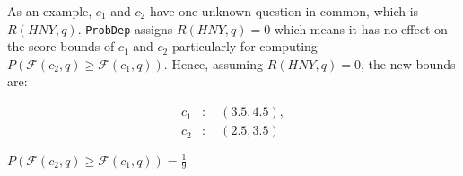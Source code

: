 \begin{comment}
\begin{center}
$Dict(c_1) = \{c_2 = 3.5, c_2 = 4\}$.    
\end{center}




Since each $c_1$ and $c_2$ have 5 possible values, there are $25$ different combinations between them, and since there are 6 edges or equivalently, there are totally 6 values for all keys/nodes in $c_1$, it means 6 of them satisfy $c_2 \geq c_1$. Hence, if $c_1$ and $c_2$ had no unknown questions in common (any unknown question that influences both candidates), then, we could conclude that: \(\mathbf{P(c_2 \geq c_1)} = \frac{6}{25}\).
\end{comment}

 As an example, $c_1$ and $c_2$ have one unknown question in common, which is $R(HNY, q)$. {\tt ProbDep} assigns $R(HNY, q) = 0$ which means it has no effect on the score bounds of $c_1$ and $c_2$ particularly for computing $P(\mathcal{F}(c_2, q) \geq \mathcal{F}(c_1, q))$. Hence, assuming $R(HNY, q) = 0$, the new bounds are:

\[    \begin{array}{ll}
    c_1 & : \quad (3.5, 4.5), \\ 
    c_2 & : \quad (2.5, 3.5)
    \end{array}
\]



\begin{center}
\(P(\mathcal{F}(c_2, q) \geq \mathcal{F}(c_1, q)) = \frac{1}{9}\)    
\end{center}

\begin{comment}
    \begin{figure}[ht]
    \centering
    \texttt{[image: figures/Example\_3\_6\_a.jpg]}
    \caption{Computing \(P(\mathcal{F}(c_2, q) \geq \mathcal{F}(c_1, q))\)}
    \label{fig:Example_3_6_b}
\end{figure}
\end{comment}



